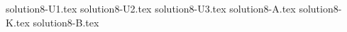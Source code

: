 \documentclass{article}
\begin{document}
{solution8-U1.tex}
{solution8-U2.tex}
{solution8-U3.tex}
{solution8-A.tex}
{solution8-K.tex}
{solution8-B.tex}
\end{document}
